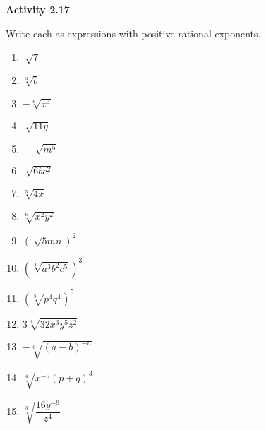 \vspace{1ex}
\noindent\textbf{Activity 2.17}

\vspace{0.75ex}

Write each as expressions with positive rational exponents.
\begin{multicols}{3}
\begin{enumerate}[noitemsep, label = \color{blue}\arabic*. ]
    \item $\sqrt[]{7}$
    \item $\sqrt[{\scriptstyle 3}]{b}$
    \item $-\sqrt[{\scriptstyle 6}]{x^{4}}$
    \item $\sqrt[]{11y}$
    \item $-~\sqrt[]{m^{5}}$
    \item $\sqrt[]{6b c^{2}}$
    \item $\sqrt[{\scriptstyle 5}]{4x}$
    \item $\sqrt[{\scriptstyle 6}]{x^{2}y^{2}}$
    \item $\left( \sqrt[]{5mn} \right)^{2}$
    \item $\left( \sqrt[{\scriptstyle 4}]{a^{3}b^{2}c^{5}} \right)^{3}$
    \item $\left( \sqrt[{\scriptstyle 8}]{p^{4}q^{4}} \right)^{5}$
    \item $ 3 \sqrt[{\scriptstyle 4}]{32 x^{3}y^{5}z^{2}} $
    \item $ -\sqrt[{\scriptstyle 6}]{\left( a-b \right)^{-n}} $
    \item $ \sqrt[{\scriptstyle 4}]{x^{-5} (p+q)^{3}} $
    \item $ \sqrt[{\scriptstyle 3}]{\dfrac{16 y^{-9}}{z^{4}}} $  
\end{enumerate}
\end{multicols}

